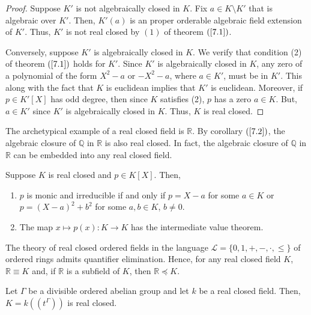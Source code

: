 \begin{proof} Suppose $K'$ is not algebraically closed in $K$.  Fix $a\in K\setminus K'$ that is algebraic over $K'$.  Then, $K'(a)$ is an proper orderable algebraic field extension of $K'$.  Thus, $K'$ is not real closed by $(1)$ of theorem $(\ref{7.1})$.

Conversely, suppose $K'$ is algebraically closed in $K$.  We verify that condition (2) of theorem $(\ref{7.1})$ holds for $K'$.  Since $K'$ is algebraically closed in $K$, any zero of a polynomial of the form $X^2-a$ or $-X^2-a$, where $a\in K'$, must be in $K'$.  This along with the fact that $K$ is euclidean implies that $K'$ is euclidean.  Moreover, if $p\in K'[X]$ has odd degree, then since $K$ satisfies (2), $p$ has a zero $a\in K$.  But, $a\in K'$ since $K'$ is algebraically closed in $K$.  Thus, $K$ is real closed.  
\end{proof}

The archetypical example of a real closed field is $\mathds{R}$.  By corollary $(\ref{7.2})$, the algebraic closure of $\mathds{Q}$ in $\mathds{R}$ is also real closed.  In fact, the algebraic closure of $\mathds{Q}$ in $\mathds{R}$ can be embedded into any real closed field.

\begin{proposition} Suppose $K$ is real closed and $p\in K[X]$.  Then,
\begin{enumerate}[(1)]
\item $p$ is monic and irreducible if and only if $p=X-a$ for some $a\in K$ or $p=(X-a)^2+b^2$ for some $a, b\in K$, $b\neq 0$. 
\item The map $x\mapsto p(x): K \rightarrow K$ has the intermediate value theorem.  \end{enumerate}\end{proposition}

\begin{theorem}[Tarksi] The theory of real closed ordered fields in the language $\mathcal{L}=\{0, 1, +, -,  \cdot, \leq\}$ of ordered rings admits quantifier elimination.  Hence, for any real closed field $K$, $\mathds{R}\equiv K$ and, if $\mathds{R}$ is a subfield of $K$, then $\mathds{R}\preceq K$.\end{theorem}

\begin{theorem} Let $\Gamma$ be a divisible ordered abelian group and let $k$ be a real closed field.  Then, $K=k((t^\Gamma))$ is real closed. \end{theorem}

